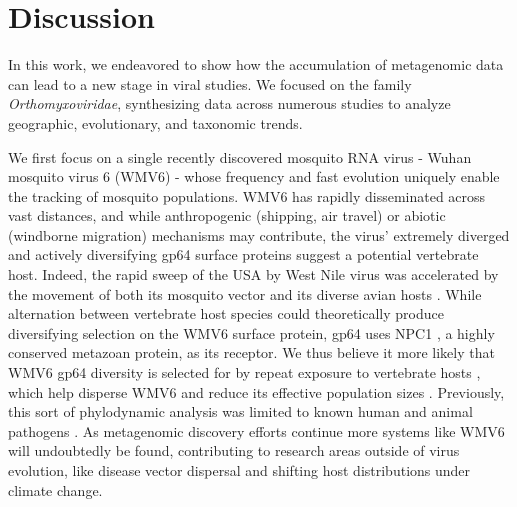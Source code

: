 \documentclass[11pt,twocolumn]{article}
\begin{document}
\section{Discussion}

In this work, we endeavored to show how the accumulation of metagenomic data can lead to a new stage in viral studies. We focused on the family \textit{Orthomyxoviridae}, synthesizing data across numerous studies to analyze geographic, evolutionary, and taxonomic trends.


We first focus on a single recently discovered mosquito RNA virus - Wuhan mosquito virus 6 \citep{li_unprecedented_2015} (WMV6) - whose frequency and fast evolution uniquely enable the tracking of mosquito populations. WMV6 has rapidly disseminated across vast distances, and while anthropogenic (shipping, air travel) \citep{lounibos_invasions_2002,fonseca_pathways_2006,bataille_evidence_2009} or abiotic (windborne migration) \citep{huestis_windborne_2019} mechanisms may contribute, the virus' extremely diverged and actively diversifying gp64 surface proteins suggest a potential vertebrate host. Indeed, the rapid sweep of the USA by West Nile virus was accelerated by the movement of both its mosquito vector and its diverse avian hosts \citep{di_giallonardo_fluid_2015}. While alternation between vertebrate host species could theoretically produce diversifying selection on the WMV6 surface protein, gp64 uses NPC1 \citep{li_baculovirus_2019}, a highly conserved metazoan protein, as its receptor. We thus believe it more likely that WMV6 gp64 diversity is selected for by repeat exposure to vertebrate hosts \citep{jong_antigenic_2007}, which help disperse WMV6 \citep{lycett_brief_2019} and reduce its effective population sizes \citep{bedford_strength_2011}. Previously, this sort of phylodynamic analysis was limited to known human and animal pathogens \citep{drummond_measurably_2003,wheeler_spatial_2010}. As metagenomic discovery efforts continue more systems like WMV6 will undoubtedly be found, contributing to research areas outside of virus evolution, like disease vector dispersal and shifting host distributions under climate change.
\end{document}
